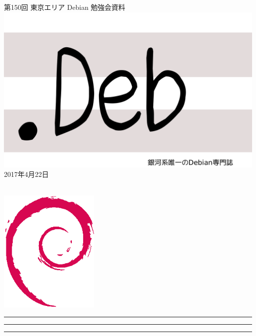 \documentclass[mingoth,a4paper]{jsarticle}
\newcommand{\debmtgyear}{2017}
\newcommand{\debmtgmonth}{4}
\newcommand{\debmtgdate}{22}
\newcommand{\debmtgnumber}{150}
\begin{document}
\begin{titlepage}
\thispagestyle{empty}

\vspace*{-2cm}
第\debmtgnumber{}回 東京エリア Debian 勉強会資料\\
\hspace*{-2cm}
\includegraphics{image2012-natsu/dotdeb.pdf}\\
\hfill{}\debmtgyear{}年\debmtgmonth{}月\debmtgdate{}日

\\

\vspace*{-2cm}
\hfill{}\includegraphics[height=6cm]{image200502/openlogo-nd.eps}
\end{titlepage}

\newpage

\begin{minipage}[b]{0.2\hsize}
 \colorbox{titleback}{}
\end{minipage}
\begin{minipage}[b]{0.8\hsize}
\hrule
\vspace{2mm}
\hrule
\begin{multicols}{2}
\tableofcontents
\end{multicols}
\vspace{2mm}
\hrule
\end{minipage}
\end{document}
